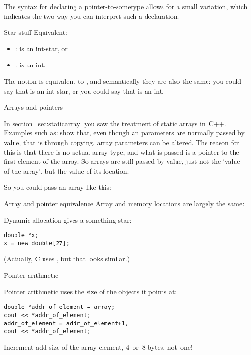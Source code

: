 The syntax for declaring a pointer-to-sometype allows for a small
variation, which indicates the two way you can interpret such a declaration.

\begin{block}{Star stuff}
  \label{sl:starstuff}
  Equivalent:
  \begin{itemize}
  \item {}:  is an int-star, or
  \item {}:  is an int.
  \end{itemize}
\end{block}

The notion  is equivalent to , and
semantically they are also the same: you could say that  is an
int-star, or you could say that  is an int.

 {Arrays and pointers}
\label{sec:arraypointer}

In section~\ref{sec:staticarray} you saw the treatment of static
arrays in~C++. Examples such as:
%
%
show that, even though an parameters are normally passed by value, that is
through copying, array parameters can be altered. The reason for this
is that there is no actual array type, and what is passed is a pointer
to the first element of the array. So arrays are still passed by
value, just not the `value of the array', but the value of its
location.

So you could pass an array like this:
%

\begin{block}{Array and pointer equivalence}
  \label{sl:array-pointer}
  Array and memory locations are largely the same:
\end{block}

\begin{block}{Dynamic allocation}
  \label{sl:newstar}
   gives a something-star:
\begin{lstlisting}
double *x;
x = new double[27];
\end{lstlisting}
(Actually, C uses , but that looks similar.)
\end{block}

 {Pointer arithmetic}

\begin{block}{Pointer arithmetic}
   uses the size of the objects it
  points at:
\begin{lstlisting}
double *addr_of_element = array;
cout << *addr_of_element;
addr_of_element = addr_of_element+1;
cout << *addr_of_element;
\end{lstlisting}
Increment add size of the array element, 4~or~8 bytes, not~one!
\end{block}

